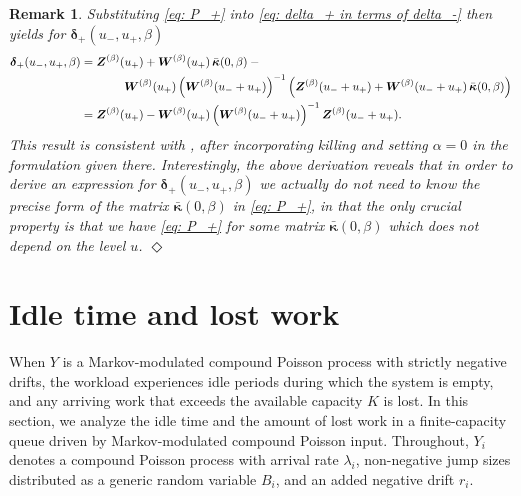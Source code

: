 \documentclass[reqno,12pt]{amsart}
\newcommand{\bs}{\boldsymbol}
\newtheorem{remark}{Remark}
\begin{document}
{\begin{remark}
{    Substituting \eqref{eq: P_+} into \eqref{eq: delta_+ in terms of delta_-} then yields for ${\bs \delta}_+(u_-, u_+, \beta)$
    \begin{align*}
        {\bs \delta}_{+}(u_-, u_+, \beta) &=  \bs{Z}^{(\beta)}(u_+) + \bs{W}^{(\beta)}(u_+)\,\bar{\bs\kappa}(0,\beta)\:
        -\\&\hspace{1.3cm}\bs{W}^{(\beta)}(u_+)\left(\bs{W}^{(\beta)}(u_-+u_+)\right)^{-1}\left(\bs{Z}^{(\beta)}(u_-+u_+) + \bs{W}^{(\beta)}(u_-+u_+)\,\bar{\bs\kappa}(0,\beta)\right)
        \\
        &= \bs{Z}^{(\beta)}(u_+) - \bs{W}^{(\beta)}(u_+)\left(\bs{W}^{(\beta)}(u_- + u_+)\right)^{-1}\bs{Z}^{(\beta)}(u_- + u_+).
    \end{align*}
    This result is consistent with \cite[Corollary~3]{IP}, after incorporating killing and setting $\alpha=0$ in the formulation given there. Interestingly, the above derivation reveals that in order to derive an expression for $\bs{\delta}_+(u_-, u_+, \beta)$ we actually do not need to know the precise form of the matrix $\bar{\bs\kappa}(0,\beta)$ in  \eqref{eq: P_+}, in that the only crucial property is that we have  \eqref{eq: P_+} for some matrix $\bar{\bs\kappa}(0,\beta)$ which does not depend on the level $u$. \hfill$\Diamond$
    }
\end{remark}



\section{Idle time and lost work}\label{sec: extensions}
When $Y$ is a Markov-modulated compound Poisson process with strictly negative drifts, the workload experiences idle periods during which the system is empty, and any arriving work that exceeds the available capacity $K$ is lost. In this section, we analyze the idle time and the amount of lost work in a finite-capacity queue driven by Markov-modulated compound Poisson input. Throughout, $Y_i$ denotes a compound Poisson process with arrival rate $\lambda_i$, non-negative jump sizes distributed as a generic random variable $B_i$, and an added negative drift $r_i$.


}
\end{document}
